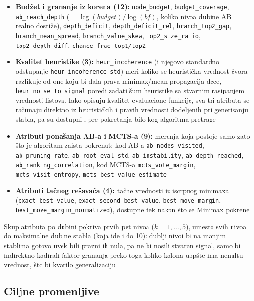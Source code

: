 \documentclass[12pt, a4paper]{article}
\begin{document}
\begin{itemize}[noitemsep]
    \texttt{leaf\_value\_mean\_d\textit{k}},
    \texttt{leaf\_value\_std\_d\textit{k}}, \texttt{branching\_mean\_d\textit{k}} za
    $k = 1, \ldots, 5$;
    \item \textbf{Budžet i grananje iz korena (12):} \texttt{node\_budget},
    \texttt{budget\_coverage}, \texttt{ab\_reach\_depth} ($= \log(\mathit{budget}) /
    \log(\mathit{bf})$, koliko nivoa dubine AB realno dostiže), \texttt{depth\_deficit},
    \texttt{depth\_deficit\_rel}, \texttt{branch\_top2\_gap}, \texttt{branch\_mean\_spread},
    \texttt{branch\_value\_skew}, \texttt{top2\_size\_ratio}, \texttt{top2\_depth\_diff},
    \texttt{chance\_frac\_top1/top2}
    \item \textbf{Kvalitet heuristike (3):} \texttt{heur\_incoherence} (i njegovo standardno
    odstupanje \texttt{heur\_incoherence\_std}) meri koliko se heuristička vrednost čvora
    razlikuje od one koju bi dala prava minimax/mean propagacija dece,
    \texttt{heur\_noise\_to\_signal} poredi zadati šum heuristike sa stvarnim rasipanjem
    vrednosti listova. Iako opisuju kvalitet evaluacione funkcije, sva tri atributa se računaju
    direktno iz heurističkih i pravih vrednosti dodeljenih pri generisanju stabla, pa su
    dostupni i pre pokretanja bilo kog algoritma pretrage
    \item \textbf{Atributi ponašanja AB-a i MCTS-a (9):} merenja koja postoje samo zato
    što je algoritam zaista pokrenut: kod AB-a \texttt{ab\_nodes\_visited},
    \texttt{ab\_pruning\_rate}, \texttt{ab\_root\_eval\_std}, \texttt{ab\_instability},
    \texttt{ab\_depth\_reached}, \texttt{ab\_ranking\_correlation}, kod MCTS-a
    \texttt{mcts\_vote\_margin}, \texttt{mcts\_visit\_entropy},
    \texttt{mcts\_best\_value\_estimate}
    \item \textbf{Atributi tačnog rešavača (4):} tačne vrednosti iz iscrpnog minimaxa
    (\texttt{exact\_best\_value}, \texttt{exact\_second\_best\_value},
    \texttt{best\_move\_margin}, \texttt{best\_move\_margin\_normalized}), dostupne tek nakon
    što se Minimax pokrene
\end{itemize}

Skup atributa po dubini pokriva prvih pet nivoa ($k=1,\ldots,5$), umesto svih nivoa do
maksimalne dubine stabla (koja ide i do 10): dublji nivoi bi na manjim stablima gotovo uvek
bili prazni ili nula, pa ne bi nosili stvaran signal, samo bi indirektno kodirali faktor
grananja preko toga koliko kolona uopšte ima nenultu vrednost, što bi kvarilo generalizaciju

\subsection{Ciljne promenljive}
\end{document}
